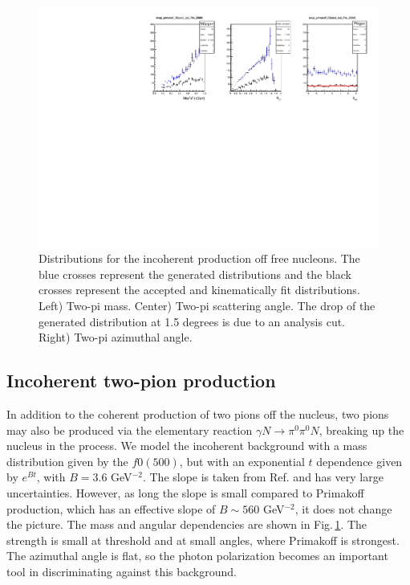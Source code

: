 \begin{figure}[tbp]
\begin{center}
\includegraphics[width=16cm,clip=true]{figures/twopi_primakoff_DSelect_test_File_20000_IC.pdf}
\caption{Distributions for the incoherent production off free nucleons. The blue crosses represent the generated distributions and the black crosses represent the accepted and kinematically fit distributions.
Left) Two-pi mass. Center) Two-pi scattering angle. The drop of the generated distribution at 1.5 degrees is due to an analysis cut. Right) Two-pi azimuthal angle.
\label{fig:IC}}
\end{center} 
\end{figure}

\subsection{Incoherent two-pion production}
In addition to the coherent production of two pions off the nucleus, two pions may also be produced via the elementary reaction $\gamma N\to \pi^0 \pi^0 N$, breaking up the nucleus in the process. We model the incoherent background with a mass distribution given by the $f0(500)$, but with an exponential $t$ dependence given by $e^{Bt}$, with $B=3.6$ GeV$^{-2}$. The slope is taken from Ref.\cite{Battaglieri:2009aa} and has very large uncertainties. However, as long the slope is small compared to Primakoff production, which has an effective slope of $B\sim560$ GeV$^{-2}$, it does not change the picture. The mass and angular dependencies are shown in Fig.\,\ref{fig:IC}. The strength is small at threshold and at small angles, where Primakoff is strongest. The azimuthal angle is flat, so the photon polarization becomes an important tool in discriminating against this background. 

